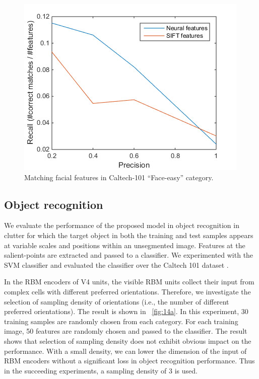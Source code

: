 \documentclass[twocolumn]{article}
\begin{document}
\begin{figure}
\centerline{\includegraphics[width=0.9\linewidth]{images/fig13.jpg}} 
\caption{Matching facial features in Caltech-101 ``Face-easy'' category.}
\label{fig:13}
\end{figure}

\subsection{Object recognition}

We evaluate the performance of the proposed model in object recognition in clutter for which 
the target object in both the training and test samples appears at variable scales and positions within an unsegmented image.
Features at the salient-points are extracted and passed to a classifier.
We experimented with the SVM classifier and evaluated the classifier over the Caltech 101 dataset \cite{fei2007}.

In the RBM encoders of V4 units, the visible RBM units collect their input from complex cells with different preferred orientations.
Therefore, we investigate the selection of sampling density of orientations (i.e., the number of different preferred orientations).
The result is shown in \figurename~\ref{fig:14a}.
In this experiment, 30 training samples are randomly chosen from each category.
For each training image, 50 features are randomly chosen and passed to the classifier.
The result shows that selection of sampling density does not exhibit obvious impact on the performance.
With a small density, we can lower the dimension of the input of RBM encoders without a significant loss in object recognition performance.
Thus in the succeeding experiments, a sampling density of $3$ is used. 
\end{document}
